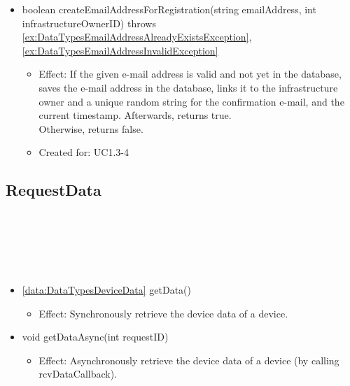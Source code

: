 \begin{description}
\begin{itemize}[noitemsep,nolistsep,leftmargin=-.25cm]
\begin{itemize}
        \end{itemize}
      \item \textsf{boolean createEmailAddressForRegistration(string emailAddress, int infrastructureOwnerID) throws \ref{ex:DataTypesEmailAddressAlreadyExistsException}, \ref{ex:DataTypesEmailAddressInvalidException}}
        \begin{itemize}[noitemsep,nolistsep]
           \item Effect: If the given e-mail address is valid and not yet in the database, saves the e-mail address
in the database, links it to the infrastructure owner and a unique random string for the confirmation e-mail,
and the current timestamp. Afterwards, returns true. \\
Otherwise, returns false.
\item Created for: UC1.3-4
        \end{itemize}
    \end{itemize}
    \end{description}

  \subsection{RequestData}\label{int:PuggableDevicePluggableDeviceRequestData}
    \begin{description}
      \item[Provided by:] \iconcomponent{}~
      \item[Required by:] \iconcomponent{}~
      \item[Operations:] ~
    \begin{itemize}[noitemsep,nolistsep,leftmargin=-.25cm]
      \item \textsf{\ref{data:DataTypesDeviceData} getData()}
        \begin{itemize}[noitemsep,nolistsep]
           \item Effect: Synchronously retrieve the device data of a device. \\
        \end{itemize}
      \item \textsf{void getDataAsync(int requestID)}
        \begin{itemize}[noitemsep,nolistsep]
           \item Effect: Asynchronously retrieve the device data of a device (by calling rcvDataCallback).
        \end{itemize}
    \end{itemize}
    \end{description}

